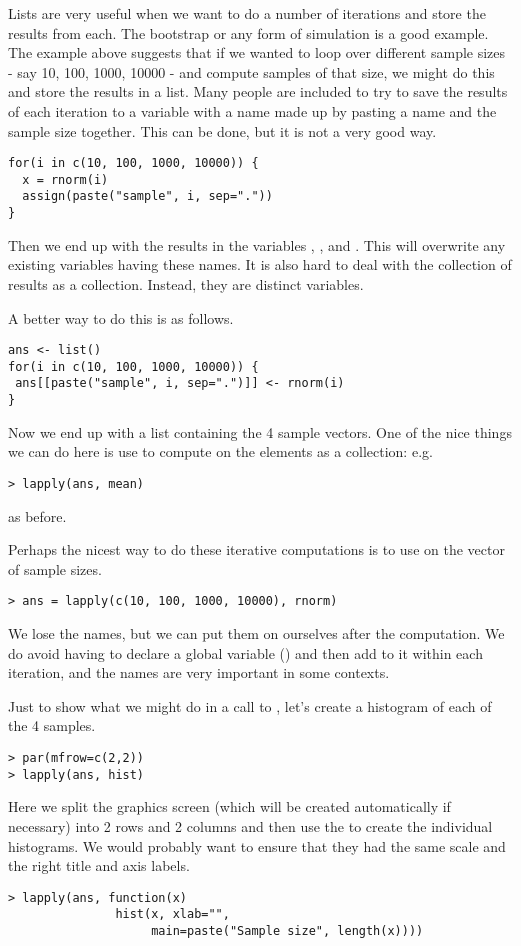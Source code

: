 Lists are very useful when we want to do a number of iterations and
store the results from each. The bootstrap or any form of simulation
is a good example. The example above suggests that if we wanted to
loop over different sample sizes - say 10, 100, 1000, 10000 - and
compute samples of that size, we might do this and store the results
in a list. Many people are included to try to save the results of each
iteration to a variable with a name made up by pasting a name and the
sample size together. This can be done, but it is not a very good way.
\begin{verbatim}
for(i in c(10, 100, 1000, 10000)) {
  x = rnorm(i)
  assign(paste("sample", i, sep="."))
}
\end{verbatim}
Then we end up with the results in the variables
, , 
and . This will overwrite any existing
variables having these names. It is also hard to deal with the
collection of results as a collection. Instead, they are distinct
variables.

A better way to do this is as follows. 
\begin{verbatim}
ans <- list()
for(i in c(10, 100, 1000, 10000)) {
 ans[[paste("sample", i, sep=".")]] <- rnorm(i)
}
\end{verbatim}
Now we end up with a list containing the 4 sample vectors. One of
the nice things we can do here is use  to compute on
the elements as a collection: e.g.
\begin{verbatim}
> lapply(ans, mean)
\end{verbatim}
as before.

Perhaps the nicest way to do these iterative computations is to use
 on the vector of sample sizes.
\begin{verbatim}
> ans = lapply(c(10, 100, 1000, 10000), rnorm)
\end{verbatim}
We lose the names, but we can put them on ourselves after the
computation. We do avoid having to declare a global variable
() and then add to it within each iteration, and the
names are very important in some contexts.

Just to show what we might do in a call to , let's
create a histogram of each of the 4 samples.
\begin{verbatim}
> par(mfrow=c(2,2))
> lapply(ans, hist)
\end{verbatim}
Here we split the graphics screen (which will be created automatically
if necessary) into 2 rows and 2 columns and then use the
 to create the individual histograms. We would
probably want to ensure that they had the same scale and the right
title and axis labels.
\begin{verbatim}
> lapply(ans, function(x) 
               hist(x, xlab="",
                    main=paste("Sample size", length(x))))
\end{verbatim}


